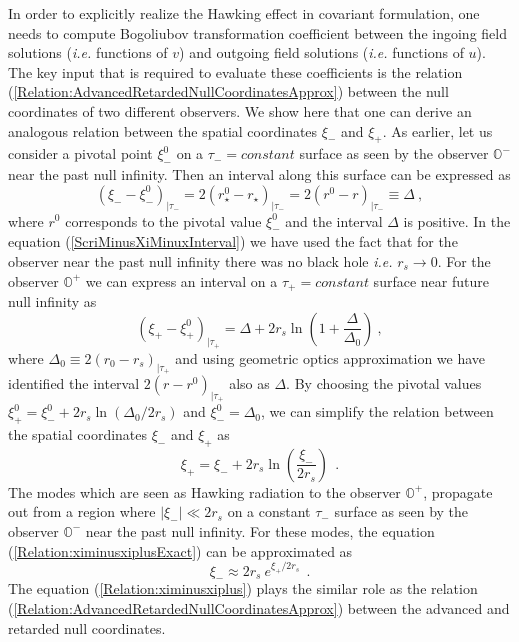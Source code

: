 \documentclass[aps,12pt,showpacs]{revtex4-2}
\def\rs{r_s}
\def\rstar{r_{\star}}
\def\observerminus{\mathbb{O}^{-}}
\def\observerplus{\mathbb{O}^{+}}
\begin{document}
In order to explicitly realize the Hawking effect in covariant formulation, one 
needs to compute Bogoliubov transformation coefficient between the ingoing 
field solutions (\emph{i.e.} functions of $v$) and outgoing field solutions 
(\emph{i.e.} functions of $u$). The key input that is required to evaluate 
these coefficients is the relation 
(\ref{Relation:AdvancedRetardedNullCoordinatesApprox}) between the null
coordinates of two different observers. We show here that one can derive an
analogous relation between the spatial coordinates $\xi_{-}$ and $\xi_{+}$. As 
earlier, let us consider a pivotal point $\xi_{-}^0$ on a $\tau_{-} = 
constant$ surface as seen by the observer $\observerminus$ near the past 
null infinity. Then an interval along this surface can be expressed as
%
\begin{equation}\label{ScriMinusXiMinuxInterval}
(\xi_{-} - \xi_{-}^0)_{|\tau_{-}} = 2(\rstar^0-\rstar)_{|\tau_{-}} =
2(r^0-r)_{|\tau_{-}} \equiv \Delta ~, 
\end{equation}
%
where $r^0$ corresponds to the pivotal value $\xi_{-}^0$ and the interval 
$\Delta$ is positive. In the equation (\ref{ScriMinusXiMinuxInterval})
we have used the fact that for the observer near the past null infinity there 
was no black hole \emph{i.e.} $\rs\to0$. For the observer $\observerplus$ we can 
express an interval on a $\tau_{+} = constant$ surface near future null infinity 
as
%
\begin{equation}\label{ScriMinusXiPlusInterval}
(\xi_{+} - \xi_{+}^0)_{|\tau_{+}} 
= \Delta + 2\rs \ln \left(1 + \frac{\Delta}{\Delta_0}\right)
 ~,
\end{equation}
%
where $\Delta_0 \equiv 2(r_0 - \rs)_{|\tau_{+}}$ and using geometric optics 
approximation we have identified the interval $2(r - r^0)_{|\tau_{+}}$ also as 
$\Delta$.  By choosing the pivotal values 
$\xi_{+}^0 = \xi_{-}^0 + 2\rs \ln (\Delta_0/2\rs)$ and $\xi_{-}^0 = \Delta_0$, 
we can simplify the relation  between the spatial coordinates $\xi_{-}$ and 
$\xi_{+}$ as
\begin{equation}\label{Relation:ximinusxiplusExact}
\xi_{+} = \xi_{-} + 2\rs \ln \left(\frac{\xi_{-}}{2\rs}\right) ~~.
\end{equation}
%
The modes which are seen as Hawking radiation to the observer $\observerplus$, 
propagate out from a region where $|\xi_{-}| \ll 2\rs$ on a constant $\tau_{-}$ 
surface as seen by the observer $\observerminus$ near the past null infinity. 
For these modes, the equation (\ref{Relation:ximinusxiplusExact}) can be 
approximated as
%
\begin{equation}\label{Relation:ximinusxiplus}
\xi_{-} \approx  2 \rs~e^{\xi_{+}/2 \rs} ~~.
\end{equation}
%
The equation (\ref{Relation:ximinusxiplus}) plays the similar role as the 
relation (\ref{Relation:AdvancedRetardedNullCoordinatesApprox}) between the 
advanced and retarded null coordinates.
\end{document}

